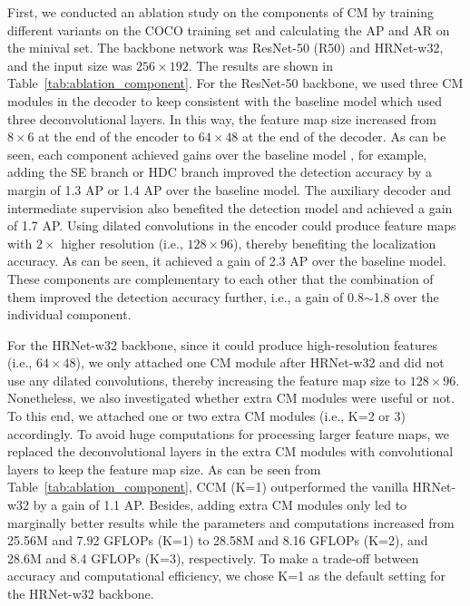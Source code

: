 \documentclass[twocolumn]{svjour3}          \smartqed  \usepackage{natbib}
\begin{document}
First, we conducted an ablation study on the components of CM by training different variants on the COCO training set and calculating the AP and AR on the minival set. The backbone network was ResNet-50 (R50) and HRNet-w32, and the input size was $256 \times 192$. The results are shown in Table~\ref{tab:ablation_component}. For the ResNet-50 backbone, we used three CM modules in the decoder to keep consistent with the baseline model which used three deconvolutional layers. In this way, the feature map size increased from $8 \times 6$ at the end of the encoder to $64 \times 48$ at the end of the decoder. As can be seen, each component achieved gains over the baseline model \citep{xiao2018simple}, for example, adding the SE branch or HDC branch improved the detection accuracy by a margin of 1.3 AP or 1.4 AP over the baseline model. The auxiliary decoder and intermediate supervision also benefited the detection model and achieved a gain of 1.7 AP. Using dilated convolutions in the encoder could produce feature maps with $2\times$ higher resolution (i.e., $128 \times 96$), thereby benefiting the localization accuracy. As can be seen, it achieved a gain of 2.3 AP over the baseline model. These components are complementary to each other that the combination of them improved the detection accuracy further, i.e., a gain of 0.8$\sim$1.8 over the individual component.

For the HRNet-w32 backbone, since it could produce high-resolution features (i.e., $64 \times 48$), we only attached one CM module after HRNet-w32 and did not use any dilated convolutions, thereby increasing the feature map size to $128 \times 96$. Nonetheless, we also investigated whether extra CM modules were useful or not. To this end, we attached one or two extra CM modules (i.e., K=2 or 3) accordingly. To avoid huge computations for processing larger feature maps, we replaced the deconvolutional layers in the extra CM modules with convolutional layers to keep the feature map size. As can be seen from Table~\ref{tab:ablation_component}, CCM (K=1) outperformed the vanilla HRNet-w32 by a gain of 1.1 AP. Besides, adding extra CM modules only led to marginally better results while the parameters and computations increased from 25.56M and 7.92 GFLOPs (K=1) to 28.58M and 8.16 GFLOPs (K=2), and 28.6M and 8.4 GFLOPs (K=3), respectively. To make a trade-off between accuracy and computational efficiency, we chose K=1 as the default setting for the HRNet-w32 backbone.
\end{document}
